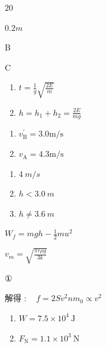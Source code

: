 \item $ 20 $
\item $ 0.2m $
\item B
\item C
\item \begin {enumerate} \renewcommand {\labelenumi }{\arabic {enumi}.} \item $t = \frac { 1 } { g } \sqrt { \frac { 2 E } { m } }$ \item $h = h _ { 1 } + h _ { 2 } = \frac { 2 E } { m g }$ \par \par \par \end {enumerate} \par \par 
\item \begin {enumerate} \renewcommand {\labelenumi }{\arabic {enumi}.} \item $v _ { \mathrm { B } } ^ { \prime } = 3.0 \mathrm { m } / \mathrm { s }$ \item $v _ { \mathrm { A } } = 4.3 \mathrm { m } / \mathrm { s }$ \par \par \par \end {enumerate} \par \par 
\item \begin {enumerate} \renewcommand {\labelenumi }{\arabic {enumi}.} \item $ 4\ m/s $ \item $ h < 3.0 \ m $ \item $ h \neq 3.6 \ m $ \end {enumerate} \par \par 
\item $W_{f}=m g h-\frac {1}{2} m u^{2}$
\item $v_{m}=\sqrt {\frac {\pi r \rho g}{3 k}}$
\item ①
\item 解得 $: \quad f=2 S v^{2} n m_{0} \propto v^{2}$
\item \begin {enumerate} \renewcommand {\labelenumi }{\arabic {enumi}.} \item $W=7.5 \times 10^{4} \ \mathrm {J}$ \par \item $F_{\mathrm {N}}=1.1 \times 10^{3} \ \mathrm {N}$ \par \end {enumerate} \par \par 

